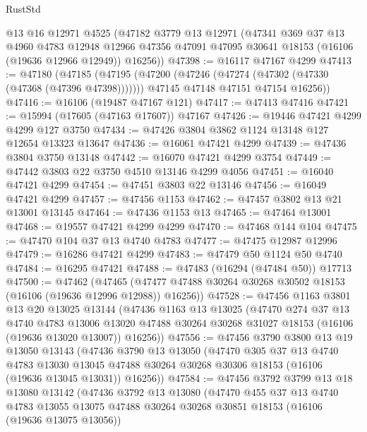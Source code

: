 \begin{lexlean}{RustStd}
\begin{coremodule}
    @13
    @16
    @12971
    @4525
    (@47182
      @3779
      @13
      @12971
      (@47341
        @369
        @37
        @13
        @4960
        @4783
        @12948
        @12966
        @47356
        @47091
        @47095
        @30641
        @18153
        (@16106 (@19636 @12966 @12949))
        @16256))
@47398 := @16117 @47167 @4299
@47413 := @47180
    (@47185
      (@47195
        (@47200 (@47246 (@47274 (@47302 (@47330 (@47368 (@47396 @47398)))))))
        @47145
        @47148
        @47151
        @47154
        @16256))
@47416 := @16106 (@19487 @47167 @121)
@47417 := @47413 @47416
@47421 := @15994 (@17605 (@47163 @17607)) @47167
@47426 := @19446 @47421 @4299 @4299 @127 @3750
@47434 := @47426 @3804 @3862 @1124 @13148 @127 @12654 @13323 @13647
@47436 := @16061 @47421 @4299
@47439 := @47436 @3804 @3750 @13148
@47442 := @16070 @47421 @4299 @3754
@47449 := @47442 @3803 @22 @3750 @4510 @13146 @4299 @4056
@47451 := @16040 @47421 @4299
@47454 := @47451 @3803 @22 @13146
@47456 := @16049 @47421 @4299
@47457 := @47456 @1153
@47462 := @47457 @3802 @13 @21 @13001 @13145
@47464 := @47436 @1153 @13
@47465 := @47464 @13001
@47468 := @19557 @47421 @4299 @4299
@47470 := @47468 @144 @104
@47475 := @47470 @104 @37 @13 @4740 @4783
@47477 := @47475 @12987 @12996
@47479 := @16286 @47421 @4299
@47483 := @47479 @50 @1124 @50 @4740
@47484 := @16295 @47421
@47488 := @47483 (@16294 (@47484 @50)) @17713
@47500 := @47462
    (@47465 (@47477 @47488 @30264 @30268 @30502 @18153 (@16106 (@19636 @12996 @12988)) @16256))
@47528 := @47456
    @1163
    @3801
    @13
    @20
    @13025
    @13144
    (@47436
      @1163
      @13
      @13025
      (@47470
        @274
        @37
        @13
        @4740
        @4783
        @13006
        @13020
        @47488
        @30264
        @30268
        @31027
        @18153
        (@16106 (@19636 @13020 @13007))
        @16256))
@47556 := @47456
    @3790
    @3800
    @13
    @19
    @13050
    @13143
    (@47436
      @3790
      @13
      @13050
      (@47470
        @305
        @37
        @13
        @4740
        @4783
        @13030
        @13045
        @47488
        @30264
        @30268
        @30306
        @18153
        (@16106 (@19636 @13045 @13031))
        @16256))
@47584 := @47456
    @3792
    @3799
    @13
    @18
    @13080
    @13142
    (@47436
      @3792
      @13
      @13080
      (@47470
        @455
        @37
        @13
        @4740
        @4783
        @13055
        @13075
        @47488
        @30264
        @30268
        @30851
        @18153
        (@16106 (@19636 @13075 @13056))

\end{coremodule}
\end{lexlean}
